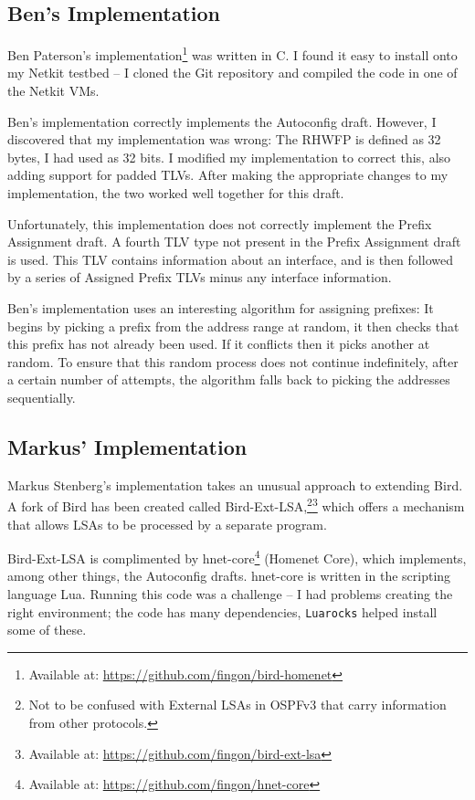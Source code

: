 \documentclass[12pt,a4paper,twoside]{report}
\begin{document}
\subsection{Ben's Implementation}
Ben Paterson's implementation\footnote{Available at:
\url{https://github.com/fingon/bird-homenet}} was written in C. I found it
easy to install onto my Netkit testbed -- I cloned the Git repository and
compiled the code in one of the Netkit VMs. 

Ben's implementation correctly implements the Autoconfig draft. However, I
discovered that my implementation was wrong: The RHWFP is defined as 32 bytes,
I had used as 32 bits. I modified my implementation to correct this, also
adding support for padded TLVs. After making the appropriate changes to my
implementation, the two worked well together for this draft.

Unfortunately, this implementation does not correctly implement the Prefix
Assignment draft. A fourth TLV type not present in the Prefix Assignment draft
is used. This TLV contains information about an interface, and is then followed
by a series of Assigned Prefix TLVs minus any interface information. 

Ben's implementation uses an interesting algorithm for assigning prefixes:
It begins by picking a prefix from the address range at random, it then checks
that this prefix has not already been used. If it conflicts then it picks
another at random. To ensure that this random process does not continue
indefinitely, after a certain number of attempts, the algorithm falls back to
picking the addresses sequentially. 

\subsection{Markus' Implementation}
Markus Stenberg's implementation takes an unusual approach to extending Bird. A
fork of Bird has been created called Bird-Ext-LSA\@,\footnote{Not to be
confused with External LSAs in OSPFv3 that carry information from other
protocols.}\footnote{Available at:
\url{https://github.com/fingon/bird-ext-lsa}} which offers a mechanism that
allows LSAs to be processed by a separate program. 

Bird-Ext-LSA is complimented by hnet-core\footnote{Available at:
\url{https://github.com/fingon/hnet-core}} (Homenet Core), which implements,
among other things, the Autoconfig drafts\@.  hnet-core is written in the
scripting language Lua. Running this code was a challenge -- I had problems
creating the right environment; the code has many dependencies,
\texttt{Luarocks} helped install some of these. 
\end{document}
